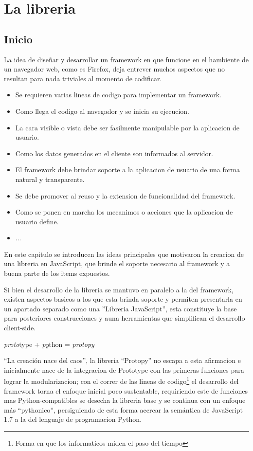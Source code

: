 \chapter{La libreria}

\section{Inicio}
La idea de diseñar y desarrollar un framework en que funcione en el hambiente
de un navegador web, como es Firefox, deja entrever muchos aspectos que no
resultan para nada triviales al momento de codificar.
\begin{itemize}
 \item Se requieren varias lineas de codigo para implementar un framework.
 \item Como llega el codigo al navegador y se inicia su ejecucion.
 \item La cara visible o vista debe ser fasilmente manipulable por la aplicacion
de usuario.
 \item Como los datos generados en el cliente son informados al servidor.
 \item El framework debe brindar soporte a la aplicacion de usuario de una forma
natural y transparente.
 \item Se debe promover al reuso y la extension de funcionalidad del framework.
 \item Como se ponen en marcha los mecanimos o acciones que la aplicacion de
usuario define.
 \item ...
\end{itemize}
En este capitulo se introducen las ideas principales que motivaron la
creacion de una libreria en JavaScript, que brinde el soporte necesario al
framework y a buena parte de los items expuestos.

Si bien el desarrollo de la libreria se mantuvo en paralelo a la del
framework, existen aspectos basicos a los que esta brinda soporte y permiten
presentarla en un apartado separado como una ''Libreria JavaScript'', esta
constituye la base para posteriores construcciones y auna herramientas que
simplifican el desarrollo client-side.

\textit{proto}type + \textit{py}thon = \textit{protopy}

``La creación nace del caos'', la libreria ``Protopy'' no escapa a esta
afirmacion e inicialmente nace de la integracion de Prototype con
las primeras funciones para lograr la modularizacion; con el correr de las
lineas de codigo\footnote{Forma en que los informaticos miden el paso del
tiempo} el desarrollo del framework torna el enfoque inicial poco sustentable,
requiriendo este de funciones mas Python-compatibles se desecha la libreria
base y se continua con un enfoque más ``pythonico'', persiguiendo de esta forma
acercar la semántica de JavaScript 1.7 a la del lenguaje de programacion Python.

